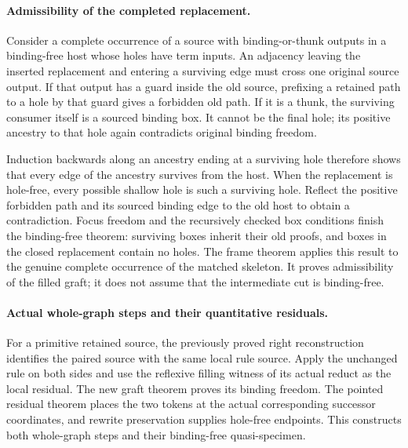 \paragraph{Admissibility of the completed replacement.}
Consider a complete occurrence of a source with binding-or-thunk outputs in
a binding-free host whose holes have term inputs. An adjacency leaving the
inserted replacement and entering a surviving edge must cross one original
source output. If that output has a guard inside the old source, prefixing
a retained path to a hole by that guard gives a forbidden old path. If it is
a thunk, the surviving consumer itself is a sourced binding box. It cannot
be the final hole; its positive ancestry to that hole again contradicts
original binding freedom.

Induction backwards along an ancestry ending at a surviving hole therefore
shows that every edge of the ancestry survives from the host. When the
replacement is hole-free, every possible shallow hole is such a surviving
hole. Reflect the positive forbidden path and its sourced binding edge to
the old host to obtain a contradiction. Focus freedom and the recursively
checked box conditions finish the binding-free theorem: surviving boxes
inherit their old proofs, and boxes in the closed replacement contain no
holes. The frame theorem applies this result to the genuine complete
occurrence of the matched skeleton. It proves admissibility of the filled
graft; it does not assume that the intermediate cut is binding-free.

\par{}
\par{}

\paragraph{Actual whole-graph steps and their quantitative residuals.}
For a primitive retained source, the previously proved right reconstruction
identifies the paired source with the same local rule source. Apply the
unchanged rule on both sides and use the reflexive filling witness of its
actual reduct as the local residual. The new graft theorem proves its binding
freedom. The pointed residual theorem places the two tokens at the actual
corresponding successor coordinates, and rewrite preservation supplies
hole-free endpoints. This constructs both whole-graph steps and their
binding-free quasi-specimen.

